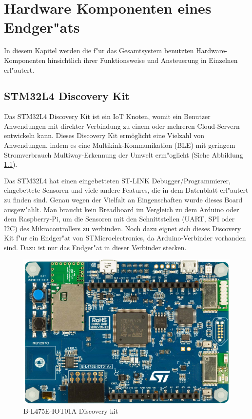 \chapter{Hardware Komponenten eines Endger"ats}\label{Komponente}

In diesem Kapitel werden die f"ur das Gesamtsystem benutzten 
Hardware- Komponenten hinsichtlich ihrer Funktionsweise und Ansteuerung 
in Einzelnen erl"autert. 

\section{STM32L4 Discovery Kit}\label{LoRa}

Das STM32L4 Discovery Kit ist ein IoT Knoten, womit ein Benutzer 
Anwendungen mit direkter Verbindung zu einem oder mehreren 
Cloud-Servern entwickeln kann.
Dieses Discovery Kit erm\"oglicht eine Vielzahl von Anwendungen, indem 
es eine Multikink-Kommunikation (\ac{BLE}) mit geringem 
Stromverbrauch  Multiway-Erkennung der Umwelt erm"oglicht (Siehe 
Abbildung \ref{Node}).

Das STM32L4 hat einen eingebetteten ST-LINK Debugger/Programmierer, 
eingebettete Sensoren und viele andere Features, die in dem Datenblatt 
\cite{B-L475E-IOT01A} erl"autert zu finden sind. Genau wegen der 
Vielfalt an Eingenschaften wurde dieses Board ausgew"ahlt. Man braucht 
kein Breadboard im Vergleich zu dem Arduino oder dem Raspberry-Pi, um 
die Sensoren mit den Schnittstellen (UART, \ac{SPI} oder I2C) des 
Mikrocontrollers zu verbinden. Noch dazu eignet sich dieses Discovery 
Kit f"ur ein Endger"at von STMicroelectronics, da Arduino-Verbinder 
vorhanden sind. Dazu ist nur das Endger"at in dieser Verbinder stecken. 

\begin{figure}[h]
	\centering
	\includegraphics[width=12cm]{source/images/Board}
	\caption{B-L475E-IOT01A Discovery kit 
	\cite{B-L475E-IOT01A}}\label{Node}
\end{figure}

